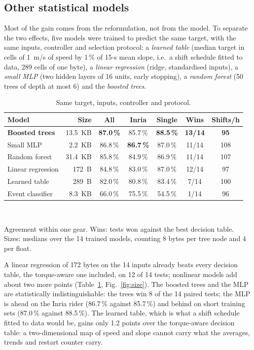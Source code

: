\documentclass[conference]{IEEEtran}
\newcommand{\pct}{\,\%}
\begin{document}
\subsection{Other statistical models}
Most of the gain comes from the reformulation, not from the model. To separate the two effects, five models were trained to predict the same target, with the same inputs, controller and selection protocol: a \emph{learned table} (median target in cells of 1~m/s of speed by 1\pct{} of 15-s mean slope, i.e.\ a shift schedule fitted to data, 289 cells of one byte), a \emph{linear regression} (ridge, standardised inputs), a \emph{small MLP} (two hidden layers of 16 units, early stopping), a \emph{random forest} (50 trees of depth at most 6) and the \emph{boosted trees}.

\begin{table}[t]
\centering
\caption{Same target, inputs, controller and protocol.}
\label{tab:models}
\setlength{\tabcolsep}{2.4pt}
\begin{tabular}{@{}lrccccc@{}}
\toprule
Model & Size & All & Inria & Single & Wins & Shifts/h \\
\midrule
\textbf{Boosted trees} & 13.5~KB & \textbf{87.0\pct} & 85.7\pct & \textbf{88.5\pct} & \textbf{13/14} & \textbf{95} \\
Small MLP & 2.2~KB & 86.8\pct & \textbf{86.7\pct} & 87.0\pct & 11/14 & 108 \\
Random forest & 31.4~KB & 85.8\pct & 84.9\pct & 86.9\pct & 11/14 & 107 \\
Linear regression & 172~B & 84.8\pct & 83.0\pct & 87.0\pct & 12/14 & 97 \\
Learned table & 289~B & 82.0\pct & 80.8\pct & 83.4\pct & 7/14 & 100 \\
Event classifier & 8.3~KB & 66.0\pct & 75.5\pct & 54.5\pct & 1/14 & 96 \\
\bottomrule
\end{tabular}
\\[2pt]
\parbox{\columnwidth}{\footnotesize Agreement within one gear. Wins: tests won against the best decision table. Sizes: medians over the 14 trained models, counting 8 bytes per tree node and 4 per float.}
\end{table}

A linear regression of 172 bytes on the 14 inputs already beats every decision table, the torque-aware one included, on 12 of 14 tests; nonlinear models add about two more points (Table~\ref{tab:models}, Fig.~\ref{fig:size}). The boosted trees and the MLP are statistically indistinguishable: the trees win 8 of the 14 paired tests; the MLP is ahead on the Inria rider (86.7\pct{} against 85.7\pct{}) and behind on short training sets (87.0\pct{} against 88.5\pct{}). The learned table, which is what a shift schedule fitted to data would be, gains only 1.2 points over the torque-aware decision table: a two-dimensional map of speed and slope cannot carry what the averages, trends and restart counter carry.
\end{document}
